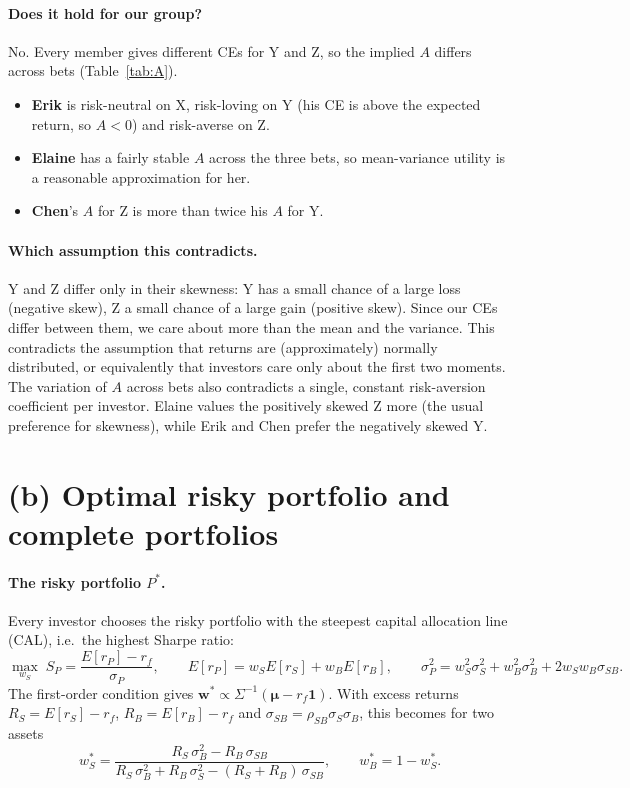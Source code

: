 \documentclass[11pt]{article}
\newcommand{\Er}[1]{E[r_{#1}]}
\begin{document}
\paragraph{Does it hold for our group?}
No. Every member gives different CEs for Y and Z, so the implied $A$ differs across bets (Table~\ref{tab:A}).
\begin{itemize}
  \item \textbf{Erik} is risk-neutral on X, risk-loving on Y (his CE is above the expected return, so $A<0$) and risk-averse on Z.
  \item \textbf{Elaine} has a fairly stable $A$ across the three bets, so mean-variance utility is a reasonable approximation for her.
  \item \textbf{Chen}'s $A$ for Z is more than twice his $A$ for Y.
\end{itemize}

\paragraph{Which assumption this contradicts.}
Y and Z differ only in their skewness: Y has a small chance of a large loss (negative skew), Z a small chance of a large gain (positive skew). Since our CEs differ between them, we care about more than the mean and the variance. This contradicts the assumption that returns are (approximately) normally distributed, or equivalently that investors care only about the first two moments. The variation of $A$ across bets also contradicts a single, constant risk-aversion coefficient per investor. Elaine values the positively skewed Z more (the usual preference for skewness), while Erik and Chen prefer the negatively skewed Y.

\section*{(b) Optimal risky portfolio and complete portfolios}

\paragraph{The risky portfolio $P^*$.}
Every investor chooses the risky portfolio with the steepest capital allocation line (CAL), i.e.\ the highest Sharpe ratio:
\[
\max_{w_S}\; S_P = \frac{\Er{P} - r_f}{\sigma_P},
\qquad
\Er{P} = w_S\Er{S} + w_B\Er{B},
\qquad
\sigma_P^2 = w_S^2\sigma_S^2 + w_B^2\sigma_B^2 + 2w_Sw_B\sigma_{SB}.
\]
The first-order condition gives $\mathbf w^* \propto \Sigma^{-1}(\boldsymbol\mu - r_f\mathbf 1)$. With excess returns $R_S = \Er{S} - r_f$, $R_B = \Er{B} - r_f$ and $\sigma_{SB} = \rho_{SB}\sigma_S\sigma_B$, this becomes for two assets
\[
w_S^* = \frac{R_S\,\sigma_B^2 - R_B\,\sigma_{SB}}{R_S\,\sigma_B^2 + R_B\,\sigma_S^2 - (R_S + R_B)\,\sigma_{SB}},
\qquad w_B^* = 1 - w_S^*.
\]
\end{document}
